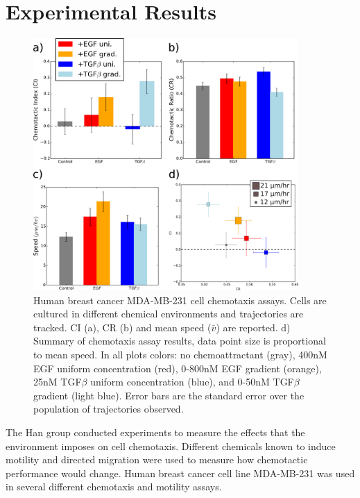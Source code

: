 \section{Experimental Results}

\begin{figure}
    \centering
    \includegraphics[width=0.90\textwidth]{../fig/ch2_fig2.png}
    \caption{Human breast cancer MDA-MB-231 cell chemotaxis assays. Cells are cultured in different chemical environments and trajectories are tracked. CI (a), CR (b) and mean speed ($\bar{v}$) are reported. d) Summary of chemotaxis assay results, data point size is proportional to mean speed. In all plots colors: no chemoattractant (gray), 400nM EGF uniform concentration (red), 0-800nM EGF gradient (orange), 25nM TGF$\beta$ uniform concentration (blue), and 0-50nM TGF$\beta$ gradient (light blue). Error bars are the standard error over the population of trajectories observed.} \label{fig:ch2_2}
\end{figure}

The Han group conducted experiments to measure the effects that the environment imposes on cell chemotaxis. Different chemicals known to induce motility and directed migration were used to measure how chemotactic performance would change. Human breast cancer cell line MDA-MB-231 was used in several different chemotaxis and motility assays.

